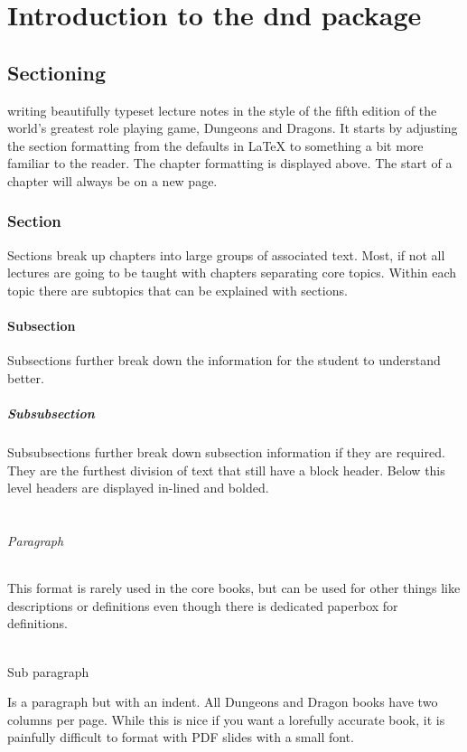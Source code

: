 \documentclass[letterpaper,10pt,twoside,twocolumn,openany]{book}
\begin{document}
\tableofcontents

\mainmatter

\twocolumn
\part{Introduction to the dnd package}
\chapter{Sectioning}
writing beautifully typeset lecture notes in the style of the fifth edition of the world's greatest role playing game, Dungeons and Dragons.
It starts by adjusting the section formatting from the defaults in \LaTeX{} to something a bit more familiar to the reader. 
The chapter formatting is displayed above. 
The start of a chapter will always be on a new page. 

\section{Section}
Sections break up chapters into large groups of associated text. Most, if not all lectures are going to be taught with chapters separating core topics. Within each topic there are subtopics that can be explained with sections. 

\subsection{Subsection}
Subsections further break down the information for the student to understand better. 

\subsubsection{Subsubsection}
Subsubsections further break down subsection information if they are required. They are the furthest division of text that still have a block header. Below this level headers are displayed in-lined and bolded.
\\~\\
\paragraph{Paragraph}
This format is rarely used in the core books, but can be used for other things like descriptions or definitions even though there is dedicated paperbox for definitions. 
\\~\\
\subparagraph{Sub paragraph}
Is a paragraph but with an indent.
\newpage
All Dungeons and Dragon books have two columns per page. While this is nice if you want a lorefully accurate book, it is painfully difficult to format with PDF slides with a small font. 
\end{document}
